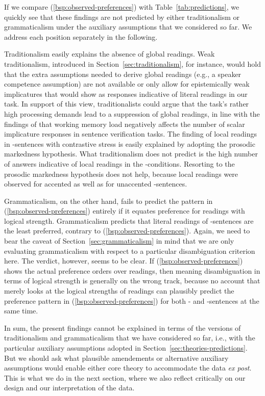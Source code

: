 \documentclass[fleqn,reqno,10pt]{article}
\newcommand{\as}{\acro{as}}
\renewcommand{\es}{\acro{es}}
\begin{document}
\noindent If we compare (\ref{bsp:observed-preferences}) with
Table~\ref{tab:predictions}, we quickly see that these findings are
not predicted by either traditionalism or grammaticalism under the
auxiliary assumptions that we considered so far. We address each
position separately in the following.

Traditionalism easily explains the absence of global readings. Weak
traditionalism, introduced in Section~\ref{sec:traditionalism}, for
instance, would hold that the extra assumptions needed to derive
global readings (e.g., a speaker competence assumption) are not
available or only allow for epistemically weak implicatures that would
show as responses indicative of literal readings in our task. In
support of this view, traditionalists could argue that the task's
rather high processing demands lead to a suppression of global
readings, in line with the findings of
\citet{NeysDe-NeysSchaeken2007:When-People-Are} that working memory
load negatively affects the number of scalar implicature responses in
sentence verification tasks. The finding of local readings in
\as-sentences with contrastive stress is easily explained by adopting
the prosodic markedness hypothesis. What traditionalism does not
predict is the high number of answers indicative of local readings in
the \es-conditions. Resorting to the prosodic markedness hypothesis
does not help, because local readings were observed for accented as
well as for unaccented \es-sentences.%

Grammaticalism, on the other hand, fails to predict the pattern in
(\ref{bsp:observed-preferences}) entirely if it equates preference for
readings with logical strength. Grammaticalism predicts that literal
readings of \as-sentences are the least preferred, contrary to
(\ref{bsp:observed-preferences}). Again, we need to bear the caveat of
Section~\ref{sec:grammaticalism} in mind that we are only evaluating
grammaticalism with respect to a particular disambiguation criterion
here. The verdict, however, seems to be clear. If
(\ref{bsp:observed-preferences}) shows the actual preference orders
over readings, then meaning disambiguation in terms of logical
strength is generally on the wrong track, because no account that
merely looks at the logical strengths of readings can plausibly
predict the preference pattern in (\ref{bsp:observed-preferences}) for
both \as- and \es-sentences at the same time.

In sum, the present findings cannot be explained in terms of the
versions of traditionalism and grammaticalism that we have considered
so far, i.e., with the particular auxiliary assumptions adopted in
Section~\ref{sec:theories-predictions}. But we should ask what
plausible amendements or alternative auxiliary assumptions would
enable either core theory to accommodate the data \emph{ex post}. This
is what we do in the next section, where we also reflect critically on
our design and our interpretation of the data.
\end{document}
